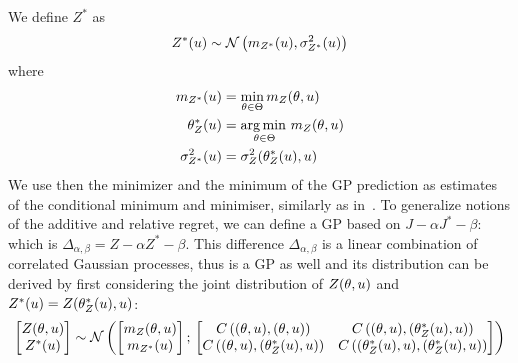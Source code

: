 \documentclass[../../Main_ManuscritThese.tex]{subfiles}
\begin{document}
We define $Z^*$ as
\begin{equation}
  Z^*(u) \sim \mathcal{N}\left(m_{Z^*}(u), \sigma^{2}_{Z^*}(u)\right)
\end{equation}
where
\begin{align}
  m_{Z^*}(u) &= \min_{\theta\in\Theta} m_Z(\theta,u) \label{eq:def_mstar}\\
  \theta_Z^*(u)&=\operatorname*{arg\,min \,}_{\theta\in\Theta} m_Z(\theta, u) \label{eq:theta_star}\\
  \sigma^{2}_{Z^*}(u) &= \sigma^{2}_Z(\theta^*_Z(u), u) \label{eq:sigma_star} 
\end{align}
We use then the minimizer and the minimum of the GP prediction as
estimates of the conditional minimum and minimiser, similarly as
in~\cite{ginsbourger_bayesian_2014}. %
To generalize notions of the additive and relative regret, we can
define a GP based on $J - \alpha J^* - \beta$: which is
$\Delta_{\alpha, \beta} = Z - \alpha Z^* - \beta$.  This difference
$\Delta_{\alpha,\beta}$ is a linear combination of correlated Gaussian
processes, thus is a GP as well and its distribution can be derived by
first considering the joint distribution of $Z(\theta,u)$ and
$Z^*(u) = Z(\theta_Z^*(u), u)$:
\begin{equation}
  \begin{bmatrix}
    Z(\theta,u) \\
    Z^*(u)
  \end{bmatrix}
  \sim \mathcal{N}\left(
    \begin{bmatrix}
      m_Z(\theta,u) \\
      m_{{Z^*}}(u)
    \end{bmatrix}
    ;\,
    \begin{bmatrix}
      C\left((\theta,u),(\theta,u)\right) & C\left((\theta,u),(\theta^*_Z(u),u)\right) \\
      C\left((\theta,u),(\theta_Z^*(u),u)\right) & C\left((\theta^*_Z(u),u),(\theta_Z^*(u),u)\right)
    \end{bmatrix}
  \right)
\end{equation}
\end{document}

